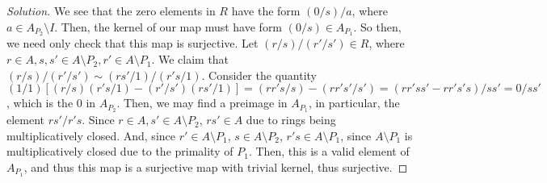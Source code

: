 \documentclass[10pt]{article}
\begin{document}
\begin{proof}[Solution]
We see that the zero elements in $R$ have the form $(0/s)/a$, where $a \in A_{P_2} \setminus I$. Then, the kernel of our map must have form $(0/s) \in A_{P_1}$. So then, we need only check that this map is surjective. Let $(r/s)/(r'/s') \in R$, where $r \in A, s,s' \in A \setminus P_2, r' \in A \setminus P_1$. We claim that $(r/s)/(r'/s') \sim (rs'/1)/(r's/1)$. Consider the quantity $(1/1)[ (r/s)(r's/1) - (r'/s')(rs'/1)] = (rr's/s) - (rr's'/s') = (rr'ss' - rr's's)/ss' = 0/ss'$, which is the $0$ in $A_{P_2}$. Then, we may find a preimage in $A_{P_1}$, in particular, the element $rs'/r's$. Since $r \in A, s' \in A \setminus P_2$, $rs' \in A$ due to rings being multiplicatively closed. And, since $r' \in A \setminus P_1$, $s \in A \setminus P_2$, $r's \in A \setminus P_1$, since $A \setminus P_1$ is multiplicatively closed due to the primality of $P_1$. Then, this is a valid element of $A_{P_1}$, and thus this map is a surjective map with trivial kernel, thus surjective.

\end{proof}
\end{document}
